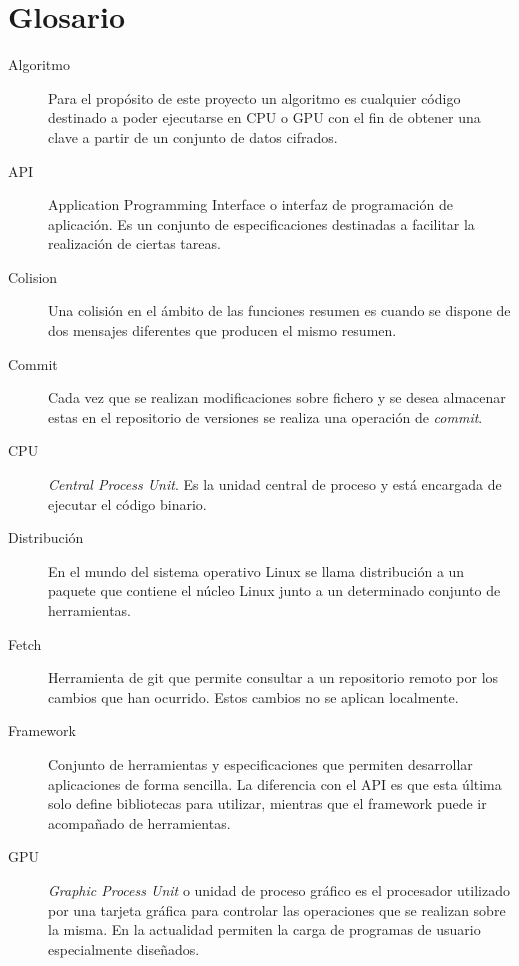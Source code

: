 \chapter{Glosario}

\begin{description}
	\item[Algoritmo] Para el propósito de este proyecto un algoritmo es cualquier código destinado a poder ejecutarse en CPU o GPU con el fin de obtener una clave a partir de un conjunto de datos cifrados.
	
	\item[API] Application Programming Interface o interfaz de programación de aplicación. Es un conjunto de especificaciones destinadas a facilitar la realización de ciertas tareas.
	
	\item[Colision] Una colisión en el ámbito de las funciones resumen es cuando se dispone de dos mensajes diferentes que producen el mismo resumen.
	
	\item[Commit] Cada vez que se realizan modificaciones sobre fichero y se desea almacenar estas en el repositorio de versiones se realiza una operación de \emph{commit}.

	\item[CPU] \emph{Central Process Unit}. Es la unidad central de proceso y está encargada de ejecutar el código binario.
	
	\item[Distribución] En el mundo del sistema operativo Linux se llama distribución a un paquete que contiene el núcleo Linux junto a un determinado conjunto de herramientas.
	
	\item[Fetch] Herramienta de git que permite consultar a un repositorio remoto por los cambios que han ocurrido. Estos cambios no se aplican localmente.
	
	\item[Framework] Conjunto de herramientas y especificaciones que permiten desarrollar aplicaciones de forma sencilla. La diferencia con el API es que esta última solo define bibliotecas para utilizar, mientras que el framework puede ir acompañado de herramientas.
	
	\item[GPU] \emph{Graphic Process Unit} o unidad de proceso gráfico es el procesador utilizado por una tarjeta gráfica para controlar las operaciones que se realizan sobre la misma. En la actualidad permiten la carga de programas de usuario especialmente diseñados.
	

\end{description}
